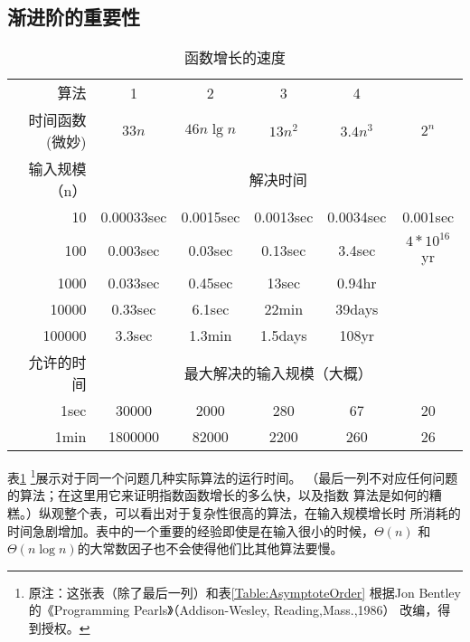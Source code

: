 \subsection{渐进阶的重要性}
\begin{table}
\begin{tabular}{rccccc}
    \hline
    算法  &1 &2 &3 &4 &  \\
    时间函数(微妙)& $33n$ & $46n\lg n$ & $13n^2$ & $3.4n^3$  &$2^n$ \\
    \hline
    输入规模（n）&  \multicolumn{5}{c}{解决时间} \\
    \hline
    10     &0.00033sec  &0.0015sec  &0.0013sec  & 0.0034sec  & 0.001sec\\
    100    &0.003sec    &0.03sec    &0.13sec    &3.4sec      &$4*10^16$yr\\
    1000   &0.033sec    &0.45sec    &13sec      &0.94hr      &      \\
    10000  &0.33sec     &6.1sec     &22min      &39days      &      \\
    100000 &3.3sec      &1.3min     &1.5days    &108yr       &      \\
    \hline
    允许的时间  &  \multicolumn{5}{c}{最大解决的输入规模（大概）} \\
    \hline
    1sec    &30000    &2000  &280   &67  &20  \\
    1min    &1800000  &82000 &2200  &260  &26\\
    \hline
\end{tabular}
\caption{函数增长的速度}
\label{Table:GrowthRateOfFunction} \centering
\end{table}

表\ref{Table:GrowthRateOfFunction}
\footnote{原注：这张表（除了最后一列）和表\ref{Table:AsymptoteOrder}
根据Jon Bentley的《Programming Pearls》（Addison-Wesley, Reading,Mass.,1986）
改编，得到授权。}展示对于同一个问题几种实际算法的运行时间。
（最后一列不对应任何问题的算法；在这里用它来证明指数函数增长的多么快，以及指数
算法是如何的糟糕。）纵观整个表，可以看出对于复杂性很高的算法，在输入规模增长时
所消耗的时间急剧增加。表中的一个重要的经验即使是在输入很小的时候，$\Theta(n)$
和$\Theta(n\log n)$的大常数因子也不会使得他们比其他算法要慢。


